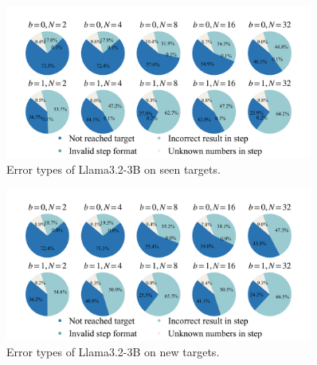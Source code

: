 \documentclass{article}
\theoremstyle{plain}
\theoremstyle{definition}
\theoremstyle{remark}
\begin{document}
\begin{figure}[htbp]
  \centering
\includegraphics[width=0.9\textwidth]{fig/pie_charts3.png}
  \caption{Error types of Llama3.2-3B on seen targets.}
  \label{fig:3seen}
\end{figure}

\begin{figure}[htbp]
  \centering
\includegraphics[width=0.9\textwidth]{fig/pie_charts4.png}
  \caption{Error types of Llama3.2-3B on new targets.}
  \label{fig:3new}
\end{figure}
\end{document}
